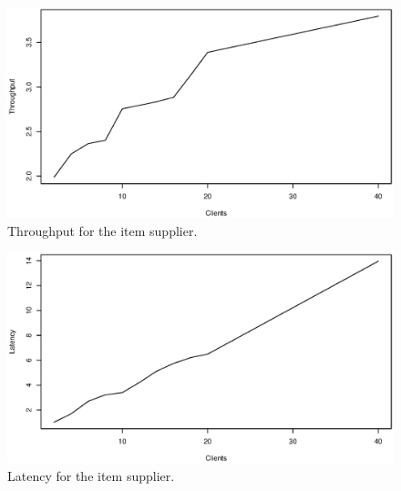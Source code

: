 \documentclass[a4paper, 12pt]{article}
\begin{document}
\begin{figure}
  \center 
  \includegraphics[scale=0.6]{throughput.eps}
  \caption{Throughput for the item supplier.}
\end{figure}

\begin{figure}
  \center
  \includegraphics[scale=0.6]{latency.eps}
  \caption{Latency for the item supplier.}
\end{figure}
\end{document}
